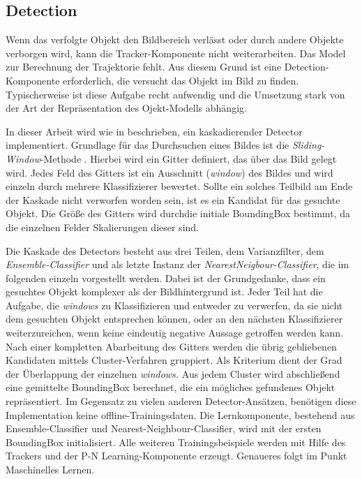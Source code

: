 	\subsection{Detection}
	Wenn das verfolgte Objekt den Bildbereich verlässt oder durch andere Objekte verborgen wird, kann die Tracker-Komponente nicht weiterarbeiten. Das Model zur Berechnung der Trajektorie fehlt. Aus diesem Grund ist eine Detection-Komponente erforderlich, die versucht das Objekt im Bild zu finden. Typischerweise ist diese Aufgabe recht aufwendig und die Umsetzung stark von der Art der Repräsentation des Ojekt-Modells abhängig.

	In dieser Arbeit wird wie in \cite{TLD} beschrieben, ein kaskadierender Detector implementiert. Grundlage für das Durchsuchen eines Bildes ist die \textit{Sliding-Window}-Methode \cite{key-6}. Hierbei wird ein Gitter definiert, das über das Bild gelegt wird. Jedes Feld des Gitters ist ein Ausschnitt (\textit{window}) des Bildes und wird einzeln durch mehrere Klassifizierer bewertet. Sollte ein solches Teilbild am Ende der Kaskade nicht verworfen worden sein, ist es ein Kandidat für das gesuchte Objekt. Die Größe des Gitters wird durchdie initiale BoundingBox bestimmt, da die einzelnen Felder Skalierungen dieser sind. 

	Die Kaskade des Detectors besteht aus drei Teilen, dem Varianzfilter, dem \textit{Ensemble-Classifier} und als letzte Instanz der \textit{NearestNeigbour-Classifier}, die im folgenden einzeln vorgestellt werden. Dabei ist der Grundgedanke, dass ein gesuchtes Objekt komplexer als der Bildhintergrund ist. Jeder Teil hat die Aufgabe, die \textit{windows} zu Klassifizieren und entweder zu verwerfen, da sie nicht dem gesuchten Objekt entsprechen können, oder an den nächsten Klassifizierer weiterzureichen, wenn keine eindeutig negative Aussage getroffen werden kann. Nach einer kompletten Abarbeitung des Gitters werden die übrig gebliebenen Kandidaten mittels Cluster-Verfahren gruppiert. Als Kriterium dient der Grad der Überlappung der einzelnen \textit{windows.} Aus jedem Cluster wird abschließend eine gemittelte BoundingBox berechnet, die ein mögliches gefundenes Objekt repräsentiert. Im Gegensatz zu vielen anderen Detector-Ansätzen, benötigen diese Implementation keine offline-Trainingsdaten. Die Lernkomponente, bestehend aus Ensemble-Classifier und Nearest-Neighbour-Classifier, wird mit der ersten BoundingBox initialisiert. Alle weiteren Trainingsbeispiele werden mit Hilfe des Trackers und der P-N Learning-Komponente erzeugt. Genaueres folgt im Punkt Maschinelles Lernen.

